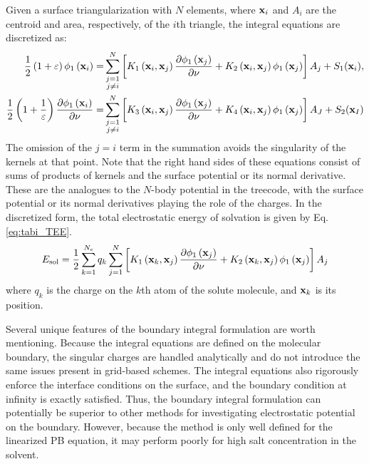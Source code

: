 \documentclass[journal=jpcbfk, manuscript=article]{achemso}
\begin{document}
Given a surface triangularization with $N$ elements, where ${\bf x}_i$ and $A_i$ are the centroid and area, respectively, of the $i$th triangle, the integral equations are discretized as:
%
\begin{equation}
\begin{split}
\frac{1}{2}\left(1+\varepsilon\right)\phi_1\left({\bf x}_i\right) =& \sum_{\substack{j=1 \\ j\neq i}}^N \left[K_1\left({\bf x}_i, {\bf x}_j\right) \frac{\partial \phi_1\left({\bf x}_j\right)}{\partial \nu} + K_2\left({\bf x}_i, {\bf x}_j\right) \phi_1\left({\bf x}_j\right) \right]A_j + S_1({\bf x}_i), \\ %
\frac{1}{2}\left(1+\frac{1}{\varepsilon}\right) \frac{\partial \phi_1\left({\bf x}_i\right)}{\partial \nu} =& \sum_{\substack{j=1 \\ j\neq i}}^N \left[K_3\left({\bf x}_i, {\bf x}_j\right) \frac{\partial \phi_1\left({\bf x}_j\right)}{\partial \nu} + K_4\left({\bf x}_i, {\bf x}_j\right) \phi_1\left({\bf x}_j\right) \right]A_J + S_2({\bf x}_I)
\end{split}
\end{equation}
%
The omission of the $j=i$ term in the summation avoids the singularity of the kernels at that point. Note that the right hand sides of these equations consist of sums of products of kernels and the surface potential or its normal derivative. These are the analogues to the $N$-body potential in the treecode, with the surface potential or its normal derivatives playing the role of the charges. In the discretized form, the total electrostatic energy of solvation is given by Eq. \ref{eq:tabi_TEE}.
%
\begin{equation}
E_\text{sol}=\frac{1}{2}\sum_{k=1}^{N_c}q_k\sum_{j=1}^N \left[K_1\left({\bf x}_k, {\bf x}_j\right) \frac{\partial \phi_1\left({\bf x}_j\right)}{\partial \nu} + K_2\left({\bf x}_k, {\bf x}_j\right) \phi_1\left({\bf x}_j\right) \right]A_j
\label{eq:tabi_TEE}
\end{equation}
%
where $q_k$ is the charge on the $k$th atom of the solute molecule, and ${\bf x}_k$ is its position.

Several unique features of the boundary integral formulation are worth mentioning. Because the integral equations are defined on the molecular boundary, the singular charges are handled analytically and do not introduce the same issues present in grid-based schemes. The integral equations also rigorously enforce the interface conditions on the surface, and the boundary condition at infinity is exactly satisfied. Thus, the boundary integral formulation can potentially be superior to other methods for investigating electrostatic potential on the boundary. However, because the method is only well defined for the linearized PB equation, it may perform poorly for high salt concentration in the solvent.
\end{document}
